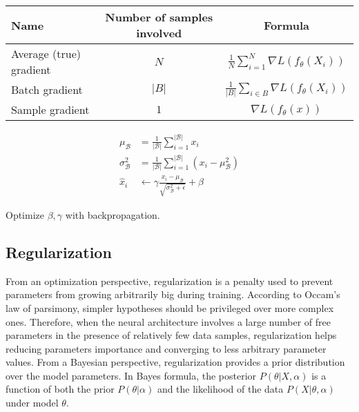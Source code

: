        \begin{table}[H]
            \centering
            \begin{tabular}{|l|c|c|}
                \hline
                Name & Number of samples involved & Formula \\
                \hline
                \hline
                Average (true) gradient & $N$ & $\frac{1}{N} \sum\limits_{i=1}^N \nabla L(f_{\theta}(X_i))$ \\
                \hline
                Batch gradient & $\vert B \vert$ & $\frac{1}{\vert B \vert} \sum\limits_{i \in B} \nabla L(f_{\theta}(X_i))$ \\
                \hline
                Sample gradient & $1$ & $\nabla L(f_{\theta}(x))$ \\
                \hline
            \end{tabular}
            \label{gradients}
        \end{table}


        \begin{equation}
            \begin{split}
                \mu_{\mathcal{B}} & = \frac{1}{\vert\mathcal{B}\vert} \sum\limits_{i=1}^{\vert\mathcal{B}\vert} x_i \\
                \sigma_{\mathcal{B}}^2 & = \frac{1}{\vert\mathcal{B}\vert} \sum\limits_{i=1}^{\vert\mathcal{B}\vert} (x_i - \mu_{\mathcal{B}}^2) \\
                \hat{x}_i & \leftarrow \gamma \frac{x_i - \mu_{\mathcal{B}}}{\sqrt{\sigma_{\mathcal{B}}^2 + \epsilon}} + \beta
            \end{split}
        \end{equation}

        Optimize $\beta, \gamma$ with backpropagation. \todo{}

    \subsection{Regularization}

	From an optimization perspective, regularization is a penalty used to prevent 
	parameters from growing arbitrarily big during training.
	According to Occam's law of parsimony, simpler hypotheses should be privileged over more complex ones.
	Therefore, when the neural architecture involves a large number of free parameters
	in the presence of relatively few data samples,
	regularization helps reducing parameters importance and converging to less arbitrary parameter values.
	From a Bayesian perspective, regularization provides a prior distribution over the model parameters.
	In Bayes formula, the posterior $P(\theta \vert X, \alpha)$ is a function of both the prior
	$P(\theta \vert \alpha)$ and the likelihood of the data $P(X \vert \theta, \alpha)$ under model $\theta$.

